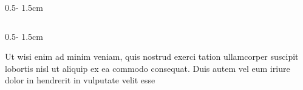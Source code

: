 \documentclass{uibposter}
\begin{document}
\begin{frame}[fragile]
\begin{columns}
\begin{column}{0.5\textwidth - 1.5cm}
\begin{column}{0.5\textwidth - 1.5cm}
{    Ut wisi enim ad minim veniam, quis nostrud exerci tation ullamcorper suscipit lobortis nisl ut aliquip ex ea commodo consequat. Duis autem vel eum iriure dolor in hendrerit in vulputate velit esse

    }
\end{column}
\end{column}
\end{columns}





\end{frame}
\end{document}
